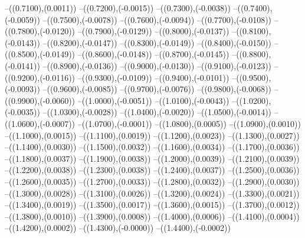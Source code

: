 {	--({\sx*(0.7100)},{\sy*(0.0011)})
	--({\sx*(0.7200)},{\sy*(-0.0015)})
	--({\sx*(0.7300)},{\sy*(-0.0038)})
	--({\sx*(0.7400)},{\sy*(-0.0059)})
	--({\sx*(0.7500)},{\sy*(-0.0078)})
	--({\sx*(0.7600)},{\sy*(-0.0094)})
	--({\sx*(0.7700)},{\sy*(-0.0108)})
	--({\sx*(0.7800)},{\sy*(-0.0120)})
	--({\sx*(0.7900)},{\sy*(-0.0129)})
	--({\sx*(0.8000)},{\sy*(-0.0137)})
	--({\sx*(0.8100)},{\sy*(-0.0143)})
	--({\sx*(0.8200)},{\sy*(-0.0147)})
	--({\sx*(0.8300)},{\sy*(-0.0149)})
	--({\sx*(0.8400)},{\sy*(-0.0150)})
	--({\sx*(0.8500)},{\sy*(-0.0149)})
	--({\sx*(0.8600)},{\sy*(-0.0148)})
	--({\sx*(0.8700)},{\sy*(-0.0145)})
	--({\sx*(0.8800)},{\sy*(-0.0141)})
	--({\sx*(0.8900)},{\sy*(-0.0136)})
	--({\sx*(0.9000)},{\sy*(-0.0130)})
	--({\sx*(0.9100)},{\sy*(-0.0123)})
	--({\sx*(0.9200)},{\sy*(-0.0116)})
	--({\sx*(0.9300)},{\sy*(-0.0109)})
	--({\sx*(0.9400)},{\sy*(-0.0101)})
	--({\sx*(0.9500)},{\sy*(-0.0093)})
	--({\sx*(0.9600)},{\sy*(-0.0085)})
	--({\sx*(0.9700)},{\sy*(-0.0076)})
	--({\sx*(0.9800)},{\sy*(-0.0068)})
	--({\sx*(0.9900)},{\sy*(-0.0060)})
	--({\sx*(1.0000)},{\sy*(-0.0051)})
	--({\sx*(1.0100)},{\sy*(-0.0043)})
	--({\sx*(1.0200)},{\sy*(-0.0035)})
	--({\sx*(1.0300)},{\sy*(-0.0028)})
	--({\sx*(1.0400)},{\sy*(-0.0020)})
	--({\sx*(1.0500)},{\sy*(-0.0014)})
	--({\sx*(1.0600)},{\sy*(-0.0007)})
	--({\sx*(1.0700)},{\sy*(-0.0001)})
	--({\sx*(1.0800)},{\sy*(0.0005)})
	--({\sx*(1.0900)},{\sy*(0.0010)})
	--({\sx*(1.1000)},{\sy*(0.0015)})
	--({\sx*(1.1100)},{\sy*(0.0019)})
	--({\sx*(1.1200)},{\sy*(0.0023)})
	--({\sx*(1.1300)},{\sy*(0.0027)})
	--({\sx*(1.1400)},{\sy*(0.0030)})
	--({\sx*(1.1500)},{\sy*(0.0032)})
	--({\sx*(1.1600)},{\sy*(0.0034)})
	--({\sx*(1.1700)},{\sy*(0.0036)})
	--({\sx*(1.1800)},{\sy*(0.0037)})
	--({\sx*(1.1900)},{\sy*(0.0038)})
	--({\sx*(1.2000)},{\sy*(0.0039)})
	--({\sx*(1.2100)},{\sy*(0.0039)})
	--({\sx*(1.2200)},{\sy*(0.0038)})
	--({\sx*(1.2300)},{\sy*(0.0038)})
	--({\sx*(1.2400)},{\sy*(0.0037)})
	--({\sx*(1.2500)},{\sy*(0.0036)})
	--({\sx*(1.2600)},{\sy*(0.0035)})
	--({\sx*(1.2700)},{\sy*(0.0033)})
	--({\sx*(1.2800)},{\sy*(0.0032)})
	--({\sx*(1.2900)},{\sy*(0.0030)})
	--({\sx*(1.3000)},{\sy*(0.0028)})
	--({\sx*(1.3100)},{\sy*(0.0026)})
	--({\sx*(1.3200)},{\sy*(0.0024)})
	--({\sx*(1.3300)},{\sy*(0.0021)})
	--({\sx*(1.3400)},{\sy*(0.0019)})
	--({\sx*(1.3500)},{\sy*(0.0017)})
	--({\sx*(1.3600)},{\sy*(0.0015)})
	--({\sx*(1.3700)},{\sy*(0.0012)})
	--({\sx*(1.3800)},{\sy*(0.0010)})
	--({\sx*(1.3900)},{\sy*(0.0008)})
	--({\sx*(1.4000)},{\sy*(0.0006)})
	--({\sx*(1.4100)},{\sy*(0.0004)})
	--({\sx*(1.4200)},{\sy*(0.0002)})
	--({\sx*(1.4300)},{\sy*(-0.0000)})
	--({\sx*(1.4400)},{\sy*(-0.0002)})
}
